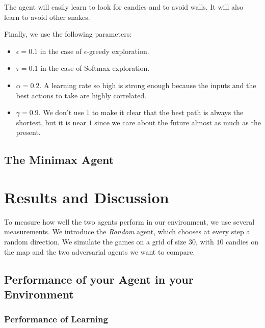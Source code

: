 \documentclass[journal, a4paper]{IEEEtran}
\begin{document}
The agent will easily learn to look for candies and to avoid walls.
It will also learn to avoid other snakes.

Finally, we use the following parameters:
\begin{itemize}
    \item $\epsilon = 0.1$ in the case of $\epsilon$-greedy exploration.
    \item $\tau = 0.1$ in the case of Softmax exploration.
    \item $\alpha = 0.2$. A learning rate so high is strong enough because the inputs and the best actions to take are highly correlated.
    \item $\gamma = 0.9$. We don't use $1$ to make it clear that the best path is always the shortest, but it is near $1$ since we care about the future almost as much as the present.
\end{itemize}

\subsection{The Minimax Agent}

\section{Results and Discussion}

To measure how well the two agents perform in our environment, we use several measurements.
We introduce the \emph{Random} agent, which chooses at every step a random direction.
We simulate the games on a grid of size $30$, with $10$ candies on the map and the two adversarial agents we want to compare.

\subsection{Performance of your Agent in your Environment}

\subsubsection{Performance of Learning}
\end{document}
